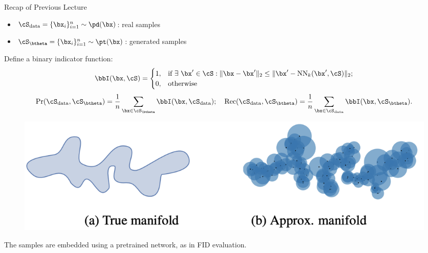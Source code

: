 \documentclass{beamer}
\begin{document}
\begin{frame}{Recap of Previous Lecture}
	\vspace{-0.2cm}
	\begin{itemize}
		\item $\cS_{\text{data}} = \{\bx_i\}_{i=1}^{n} \sim \pd(\bx)$: real samples
		\item $\cS_{\btheta} = \{\bx_i\}_{i=1}^{n} \sim \pt(\bx)$: generated samples
	\end{itemize}
	Define a binary indicator function:
	\vspace{-0.2cm}
	\[
		\bbI(\bx, \cS) = 
		\begin{cases}
			1, & \text{if}~ \exists~ \bx' \in \cS: \| \bx  - \bx'\|_2 \leq \| \bx' - \text{NN}_k(\bx', \cS)\|_2; \\
			0, & \text{otherwise}
		\end{cases}
	\]
	\vspace{-0.3cm}
	\[
		\text{Pr} (\cS_{\text{data}}, \cS_{\btheta}) = \frac{1}{n} \sum_{\bx \in \cS_{\btheta}} \bbI(\bx, \cS_{\text{data}}); \quad \text{Rec} (\cS_{\text{data}}, \cS_{\btheta}) = \frac{1}{n} \sum_{\bx \in \cS_{\text{data}}} \bbI(\bx, \cS_{\btheta}).
	\]
	\vspace{-0.7cm}
	\begin{figure}
		\includegraphics[width=0.75\linewidth]{figs/pr_k_nearest}
	\end{figure}
	\vspace{-0.3cm}
	The samples are embedded using a pretrained network, as in FID evaluation.
\end{frame}
\end{document}
